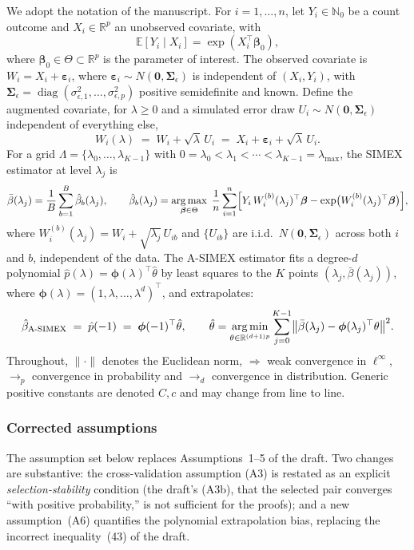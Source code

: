 \documentclass[11pt]{article}
\theoremstyle{plain}
\theoremstyle{definition}
\newcommand{\E}{\mathbb{E}}
\newcommand{\R}{\mathbb{R}}
\newcommand{\N}{\mathbb{N}}
\newcommand{\bet}{\bm{\beta}}
\newcommand{\beps}{\bm{\varepsilon}}
\newcommand{\bSig}{\bm{\Sigma}}
\newcommand{\bphi}{\bm{\phi}}
\DeclareMathOperator*{\argmax}{arg\,max}
\DeclareMathOperator*{\argmin}{arg\,min}
\newcommand{\asimex}{\textup{A-SIMEX}}
\begin{document}
We adopt the notation of the manuscript. For $i=1,\dots,n$, let
$Y_i\in\N_0$ be a count outcome and $X_i\in\R^p$ an unobserved covariate,
with
\[
  \E[Y_i\mid X_i]=\exp(X_i^\top\bet_0),
\]
where $\bet_0\in\Theta\subset\R^p$ is the parameter of interest. The observed
covariate is $W_i=X_i+\beps_i$, where $\beps_i\sim N(\bm 0,\bSig_\epsilon)$
is independent of $(X_i,Y_i)$, with $\bSig_\epsilon=\operatorname{diag}
(\sigma^2_{\epsilon,1},\dots,\sigma^2_{\epsilon,p})$ positive semidefinite
and known. Define the augmented covariate, for $\lambda\ge 0$ and a
simulated error draw $U_i\sim N(\bm 0,\bSig_\epsilon)$ independent of
everything else,
\[
  W_i(\lambda) \;=\; W_i+\sqrt{\lambda}\,U_i \;=\; X_i+\beps_i+\sqrt{\lambda}\,U_i .
\]
For a grid $\Lambda=\{\lambda_0,\dots,\lambda_{K-1}\}$ with
$0=\lambda_0<\lambda_1<\cdots<\lambda_{K-1}=\lambda_{\max}$, the SIMEX
estimator at level $\lambda_j$ is
\[
  \bar\beta(\lambda_j)=\frac1B\sum_{b=1}^{B}\hat\beta_b(\lambda_j),\qquad
  \hat\beta_b(\lambda_j)=\argmax_{\bet\in\Theta}\;
  \frac1n\sum_{i=1}^{n}\Bigl[Y_i\,W_i^{(b)}(\lambda_j)^\top\bet
  -\exp\bigl(W_i^{(b)}(\lambda_j)^\top\bet\bigr)\Bigr],
\]
where $W_i^{(b)}(\lambda_j)=W_i+\sqrt{\lambda_j}\,U_{ib}$ and
$\{U_{ib}\}$ are i.i.d.\ $N(\bm 0,\bSig_\epsilon)$ across both $i$ and $b$,
independent of the data. The \asimex{} estimator fits a degree-$d$
polynomial $\hat p(\lambda)=\bphi(\lambda)^\top\hat\theta$ by least squares
to the $K$ points $(\lambda_j,\bar\beta(\lambda_j))$, where
$\bphi(\lambda)=(1,\lambda,\dots,\lambda^d)^\top$, and extrapolates:
\[
  \hat\beta_{\asimex} \;=\; \hat p(-1)\;=\;\bphi(-1)^\top\hat\theta,
  \qquad
  \hat\theta=\argmin_{\theta\in\R^{(d+1)p}}
  \sum_{j=0}^{K-1}\bigl\|\bar\beta(\lambda_j)-\bphi(\lambda_j)^\top\theta\bigr\|^2 .
\]
Throughout, $\|\cdot\|$ denotes the Euclidean norm, $\Rightarrow$ weak
convergence in $\ell^\infty$, $\rightarrow_p$ convergence in probability and
$\rightarrow_d$ convergence in distribution. Generic positive constants are
denoted $C,c$ and may change from line to line.

\subsubsection{Corrected assumptions}\label{app:sec:assumptions}

The assumption set below replaces Assumptions~1--5 of the draft. Two changes
are substantive: the cross-validation assumption (A3) is restated as an
explicit \emph{selection-stability} condition (the draft's (A3b), that the
selected pair converges ``with positive probability,'' is not sufficient for
the proofs); and a new assumption~(A6) quantifies the polynomial
extrapolation bias, replacing the incorrect inequality~(43) of the draft.
\end{document}
